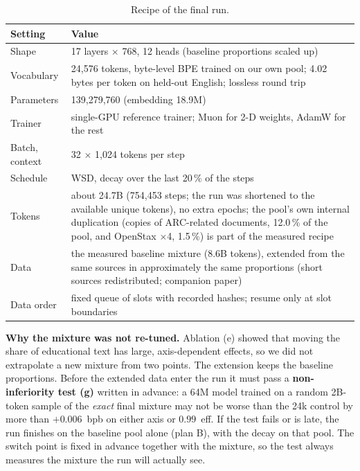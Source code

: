 \begin{table}[ht]
\centering\small
\begin{tabular}{@{}L{3.2cm}L{11.0cm}@{}}
\toprule
Setting & Value \\
\midrule
Shape & 17 layers $\times$ 768, 12 heads (baseline proportions scaled up) \\
Vocabulary & 24,576 tokens, byte-level BPE trained on our own pool; 4.02 bytes per token on held-out English; lossless round trip \\
Parameters & 139,279,760 (embedding 18.9M) \\
Trainer & single-GPU reference trainer; Muon for 2-D weights, AdamW for the rest \\
Batch, context & 32 $\times$ 1,024 tokens per step \\
Schedule & WSD, decay over the last 20\,\% of the steps \\
Tokens & about 24.7B (754,453 steps; the run was shortened to the available unique tokens), no extra epochs; the pool's own internal duplication (copies of ARC-related documents, 12.0\,\% of the pool, and OpenStax $\times$4, 1.5\,\%) is part of the measured recipe \\
Data & the measured baseline mixture (8.6B tokens), extended from the same sources in approximately the same proportions (short sources redistributed; companion paper) \\
Data order & fixed queue of slots with recorded hashes; resume only at slot boundaries \\
\bottomrule
\end{tabular}
\caption{Recipe of the final run.}
\label{tab:recipe}
\end{table}

\textbf{Why the mixture was not re-tuned.} Ablation (e) showed that moving the share of educational text has large,
axis-dependent effects, so we did not extrapolate a new mixture from two points. The extension keeps the baseline
proportions. Before the extended data enter the run it must pass a \textbf{non-inferiority test (g)} written in
advance: a 64M model trained on a random 2B-token sample of the \emph{exact} final mixture may not be worse than the
24k control by more than $+0.006$~bpb on either axis or $0.99$~eff. If the test fails or is late, the run finishes on
the baseline pool alone (plan B), with the decay on that pool. The switch point is fixed in advance together with the
mixture, so the test always measures the mixture the run will actually see.


